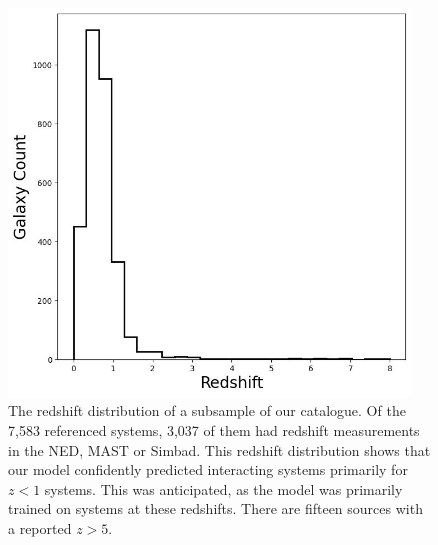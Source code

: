 {\begin{figure}
  \centering
  \includegraphics[width=0.95\textwidth]{Chapter2/figures/fig11.jpeg}
  \caption[The redshift distribution of a subsample of our catalogue.]{The redshift distribution of a subsample of our catalogue. Of the 7,583 referenced systems, 3,037 of them had redshift measurements in the NED, MAST or Simbad. This redshift distribution shows that our model confidently predicted interacting systems primarily for $z < 1$ systems. This was anticipated, as the model was primarily trained on systems at these redshifts. There are fifteen sources with a reported $z > 5$.}
  \label{fig:redshift-dist}
\end{figure}

}
